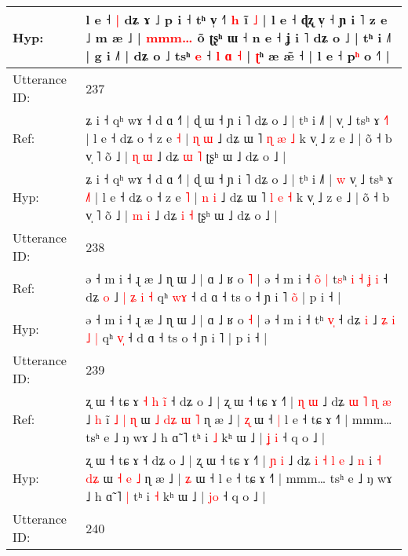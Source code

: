 \documentclass[10pt]{article}
\DeclareRobustCommand{\hl}[1]{{\textcolor{red}{#1}}}
\begin{document}
\begin{longtable}{ll}
 \\
Hyp: & l e ˧ \hl{|} dʑ ɤ ˩ p i ˧ tʰ v̩ ˧\hl{˥} \hl{h} i\hl{̃} \hl{˩} | l e ˧ ɖʐ v̩ ˧ ɲ i ˥ z e ˩ m æ ˩ | \hl{m}\hl{m}\hl{m}\hl{…} õ\hl{}\hl{} ʈʂʰ ɯ ˧ n e ˧ ʝ i ˥ dʑ o ˩ | tʰ i ˩˥ | g i ˩˥ | dʑ o\hl{}\hl{}\hl{}\hl{}\hl{}\hl{}\hl{} ˩ tsʰ \hl{e} ˧ \hl{l} \hl{ɑ} \hl{˧} | \hl{ʈ}ʰ æ æ̃ ˧ | l e ˧ p\hl{ʰ} o ˧˥ |
 \\
\midrule
Utterance ID: & 237 \\
Ref: & ʑ i ˧ qʰ wɤ ˧ d ɑ ˧˥ | ɖ ɯ ˧ ɲ i ˥ dʑ o ˩ | tʰ i ˩˥ |\hl{}\hl{} v̩ ˩ tsʰ ɤ \hl{˧}˥ | l e ˧ dʑ o ˧ z e \hl{˧} | \hl{ɳ} \hl{ɯ} ˩ dʑ ɯ ˥ \hl{ɳ} \hl{æ} \hl{˩} k v̩ ˩ z e ˩ | õ ˧ b v̩ ˥ õ ˩ | \hl{ɳ} \hl{ɯ} ˩ dʑ \hl{ɯ} \hl{˥} ʈʂʰ ɯ ˩ dʑ o ˩ |
 \\
Hyp: & ʑ i ˧ qʰ wɤ ˧ d ɑ ˧˥ | ɖ ɯ ˧ ɲ i ˥ dʑ o ˩ | tʰ i ˩˥ |\hl{ }\hl{w} v̩ ˩ tsʰ ɤ \hl{˩}˥ | l e ˧ dʑ o ˧ z e \hl{˥} | \hl{n} \hl{i} ˩ dʑ ɯ ˥ \hl{l} \hl{e} \hl{˧} k v̩ ˩ z e ˩ | õ ˧ b v̩ ˥ õ ˩ | \hl{m} \hl{i} ˩ dʑ \hl{i} \hl{˧} ʈʂʰ ɯ ˩ dʑ o ˩ |
 \\
\midrule
Utterance ID: & 238 \\
Ref: & ə ˧ m i ˧ ɻ æ ˩ ɳ ɯ ˩ | ɑ ˩ ʁ o \hl{˥} | ə ˧ m i ˧\hl{ }\hl{o}\hl{̃}\hl{ }\hl{|} t\hl{s}ʰ\hl{ }\hl{i}\hl{ }\hl{˧} \hl{ʝ}\hl{ }\hl{i} ˧ dʑ \hl{o} ˩ \hl{|} \hl{ʑ} \hl{i} \hl{˧} qʰ \hl{w}\hl{ɤ} ˧ d ɑ ˧ ts o ˧ ɲ i ˥\hl{ }\hl{o}\hl{̃} | p i ˧ |
 \\
Hyp: & ə ˧ m i ˧ ɻ æ ˩ ɳ ɯ ˩ | ɑ ˩ ʁ o \hl{˧} | ə ˧ m i ˧\hl{}\hl{}\hl{}\hl{}\hl{} t\hl{}ʰ\hl{}\hl{}\hl{}\hl{} \hl{}\hl{v}\hl{̩} ˧ dʑ \hl{i} ˩ \hl{ʑ} \hl{i} \hl{˩} \hl{|} qʰ \hl{v}\hl{̩} ˧ d ɑ ˧ ts o ˧ ɲ i ˥\hl{}\hl{}\hl{} | p i ˧ |
 \\
\midrule
Utterance ID: & 239 \\
Ref: & ʐ ɯ ˧ tɕ ɤ\hl{ }\hl{˧}\hl{ }\hl{h}\hl{ }\hl{i}\hl{̃} ˧ dʑ o ˩ | ʐ ɯ ˧ tɕ ɤ ˧˥ | \hl{ɳ} \hl{ɯ} ˩ dʑ \hl{ɯ} \hl{˥} \hl{ɳ} \hl{æ} ˩ \hl{h} i\hl{̃} \hl{˩} \hl{|}\hl{ }\hl{ɳ} ɯ\hl{ }\hl{˩} \hl{d}\hl{ʑ} \hl{ɯ} \hl{˥} ɳ æ ˩ | \hl{ʐ} ɯ ˧\hl{ }\hl{|} l e ˧ tɕ ɤ ˧˥ | mmm… tsʰ e ˩ ŋ wɤ ˩ h ɑ̃ ˥\hl{}\hl{} tʰ i \hl{˩} kʰ ɯ ˩ | \hl{ʝ}\hl{ }\hl{i} ˧ q o ˩ |
 \\
Hyp: & ʐ ɯ ˧ tɕ ɤ\hl{}\hl{}\hl{}\hl{}\hl{}\hl{}\hl{} ˧ dʑ o ˩ | ʐ ɯ ˧ tɕ ɤ ˧˥ | \hl{ɲ} \hl{i} ˩ dʑ \hl{i} \hl{˧} \hl{l} \hl{e} ˩ \hl{n} i\hl{} \hl{˧} \hl{}\hl{d}\hl{ʑ} ɯ\hl{}\hl{} \hl{}\hl{˧} \hl{e} \hl{˩} ɳ æ ˩ | \hl{ʑ} ɯ ˧\hl{}\hl{} l e ˧ tɕ ɤ ˧˥ | mmm… tsʰ e ˩ ŋ wɤ ˩ h ɑ̃ ˥\hl{ }\hl{|} tʰ i \hl{˧} kʰ ɯ ˩ | \hl{}\hl{j}\hl{o} ˧ q o ˩ |
 \\
\midrule
Utterance ID: & 240 \\

\end{longtable}
\end{document}
